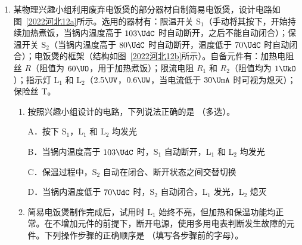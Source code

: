 \documentclass[\gkver]{gaokaozhenti}
\begin{document}
\begin{enumerate}
{整理有

$\Delta E_{\text{p弹}}=k(L-L_{0})h_{5}-\frac{1}{2}kh_{5}^{2}$

打 F 点时钩码的速度为

$v_{F}=\frac{h_{5}-h_{3}}{2T}$

由于在误差允许的范围内，认为释放钩码的同时打出 A 点，则钩码动能的增加量为

$\Delta E_{k}=\frac{1}{2}mv_{F}^{2}-0=\frac{m(h_{5}-h_{3})^{2}}{8T^{2}}$

钩码的重力势能增加量为 $\Delta E_{\text{p重}}=mgh_{5}$

（2）钩码机械能的增加量，即钩码动能和重力势能增加量的总和，若无阻力做功则弹簧弹性势能的减少量等于钩码机械能的增加量。现在随着 $h$ 增加，两条曲线在纵向的间隔逐渐变大，而两条曲线在纵向的间隔即阻力做的功，则产生这个问题的主要原因是钩码和纸带运动的速度逐渐增大，导致空气阻力逐渐增大，以至于空气阻力做的功也逐渐增大。
}

\item
某物理兴趣小组利用废弃电饭煲的部分器材自制简易电饭煲，设计电路如图~\ref{2022河北12a}所示。选用的器材有：限温开关 S$_{1}$（手动将其按下，开始持续加热煮饭，当锅内温度高于 $103\UdC$ 时自动断开，之后不能自动闭合）；保温开关 S$_{2}$（当锅内温度高于 $80\UdC$ 时自动断开，温度低于 $70\UdC$ 时自动闭合）；电饭煲的框架（结构如图~\ref{2022河北12b}所示）。自备元件有：加热电阻丝 $R$（阻值为 $60\UO$，用于加热煮饭）；限流电阻 $R_{1}$ 和 $R_{2}$（阻值均为 $1\UkO$）；指示灯 L$_{1}$ 和 L$_{2}$（$2.5\UV$，$0.6\UW$，当电流低于 $30\UmA$ 时可视为熄灭）；保险丝 T。
\begin{enumerate}
	\item
	按照兴趣小组设计的电路，下列说法正确的是 （多选）。

	A．按下 S$_{1}$，L$_{1}$ 和 L$_{2}$ 均发光

	B．当锅内温度高于 $103\UdC$ 时，S$_{1}$ 自动断开，L$_{1}$ 和 L$_{2}$ 均发光

	C．保温过程中，S$_{2}$ 自动在闭合、断开状态之间交替切换

	D．当锅内温度低于 $70\UdC$ 时，S$_{2}$ 自动闭合，L$_{1}$ 发光，L$_{2}$ 熄灭
	\item
	简易电饭煲制作完成后，试用时 L$_{1}$ 始终不亮，但加热和保温功能均正常。在不增加元件的前提下，断开电源，使用多用电表判断发生故障的元件。下列操作步骤的正确顺序是 （填写各步骤前的字母）。


\end{enumerate}
\end{enumerate}
\end{document}
